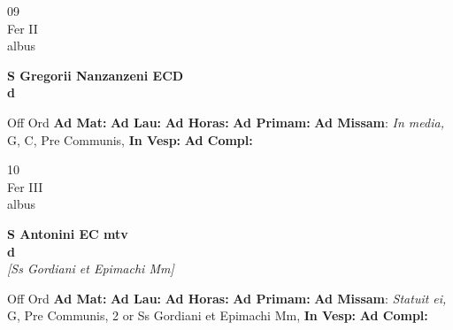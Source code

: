 \documentclass[10pt, openany]{book}
\begin{document}
    \begin{center}
        \begin{minipage}{3.5in}
            \vspace{2em}
            \begin{minipage}{0.5in}
                {\Huge 09} \\
                {\normalsize Fer II} \\
                {\normalsize albus}
            \end{minipage}
            \begin{minipage}{3.0in}
                \textbf{ \large S Gregorii Nanzanzeni ECD \\
                \textnormal{\normalsize d}} \\ 
            \end{minipage}
            \begin{justify}Off Ord
                \textbf{Ad Mat: }
                \textbf{Ad Lau: }
                \textbf{Ad Horas: }
                \textbf{Ad Primam: }\textbf{Ad Missam}: \textit{In media,} G, C, Pre Communis,  
                \textbf{In Vesp: }
                \textbf{Ad Compl: }
            \end{justify}
        \end{minipage}
    \end{center}

    \begin{center}
        \begin{minipage}{3.5in}
            \vspace{2em}
            \begin{minipage}{0.5in}
                {\Huge 10} \\
                {\normalsize Fer III} \\
                {\normalsize albus}
            \end{minipage}
            \begin{minipage}{3.0in}
                \textbf{ \large S Antonini EC mtv \\
                \textnormal{\normalsize d}} \\ \textit{[Ss Gordiani et Epimachi Mm]} \\ 
            \end{minipage}
            \begin{justify}Off Ord
                \textbf{Ad Mat: }
                \textbf{Ad Lau: }
                \textbf{Ad Horas: }
                \textbf{Ad Primam: }\textbf{Ad Missam}: \textit{Statuit ei,} G, Pre Communis, 2 or Ss Gordiani et Epimachi Mm,  
                \textbf{In Vesp: }
                \textbf{Ad Compl: }
            \end{justify}
        \end{minipage}
    \end{center}
\end{document}
